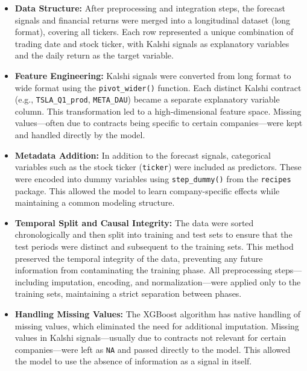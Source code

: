 \documentclass[12pt]{report}
\begin{document}
\begin{itemize}
    \item \textbf{Data Structure:} After preprocessing and integration steps, the forecast signals and financial returns were merged into a longitudinal dataset (long format), covering all tickers. Each row represented a unique combination of trading date and stock ticker, with Kalshi signals as explanatory variables and the daily return as the target variable.

    \item \textbf{Feature Engineering:} Kalshi signals were converted from long format to wide format using the \texttt{pivot\_wider()} function. Each distinct Kalshi contract (e.g., \texttt{TSLA\_Q1\_prod}, \texttt{META\_DAU}) became a separate explanatory variable column. This transformation led to a high-dimensional feature space. Missing values—often due to contracts being specific to certain companies—were kept and handled directly by the model.

    \item \textbf{Metadata Addition:} In addition to the forecast signals, categorical variables such as the stock ticker (\texttt{ticker}) were included as predictors. These were encoded into dummy variables using \texttt{step\_dummy()} from the \texttt{recipes} package. This allowed the model to learn company-specific effects while maintaining a common modeling structure.

    \item \textbf{Temporal Split and Causal Integrity:} The data were sorted chronologically and then split into training and test sets to ensure that the test periods were distinct and subsequent to the training sets. This method preserved the temporal integrity of the data, preventing any future information from contaminating the training phase. All preprocessing steps—including imputation, encoding, and normalization—were applied only to the training sets, maintaining a strict separation between phases.

    \item \textbf{Handling Missing Values:} The XGBoost algorithm has native handling of missing values, which eliminated the need for additional imputation. Missing values in Kalshi signals—usually due to contracts not relevant for certain companies—were left as \texttt{NA} and passed directly to the model. This allowed the model to use the absence of information as a signal in itself.
\end{itemize}
\end{document}
